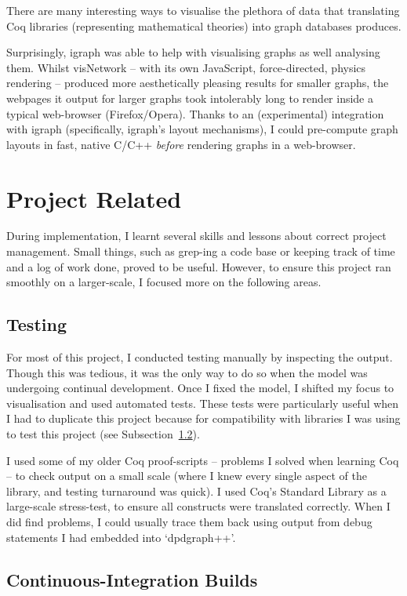 There are many interesting ways to visualise the plethora of data that
translating Coq libraries (representing mathematical theories) into graph
databases produces.

Surprisingly, igraph was able to help with visualising graphs as well analysing
them.  Whilst visNetwork -- with its own JavaScript, force-directed, physics
rendering -- produced more aesthetically pleasing results for smaller graphs,
the webpages it output for larger graphs took intolerably long to render inside
a typical web-browser (Firefox/Opera). Thanks to an (experimental) integration
with igraph (specifically, igraph's layout mechanisms), I could pre-compute
graph layouts in fast, native C/C++ \emph{before} rendering graphs in a
web-browser.

\section{Project Related}

During implementation, I learnt several skills and lessons about correct project
management. Small things, such as grep-ing a code base or keeping track of time
and a log of work done, proved to be useful. However, to ensure this project ran
smoothly on a larger-scale, I focused more on the following areas.

\subsection{Testing}

For most of this project, I conducted testing manually by inspecting the output.
Though this was tedious, it was the only way to do so when the model was
undergoing continual development. Once I fixed the model, I shifted my focus to
visualisation and used automated tests. These tests were particularly useful
when I had to duplicate this project because for compatibility with libraries I
was using to test this project (see Subsection~\ref{subsec:cibuilds}).

I used some of my older Coq proof-scripts -- problems I solved when learning Coq
-- to check output on a small scale (where I knew every single aspect of the
library, and testing turnaround was quick). I used Coq's Standard Library as a
large-scale stress-test, to ensure all constructs were translated correctly.
When I did find problems, I could usually trace them back using output from debug
statements I had embedded into `dpdgraph++'.

\subsection{Continuous-Integration Builds}\label{subsec:cibuilds}

